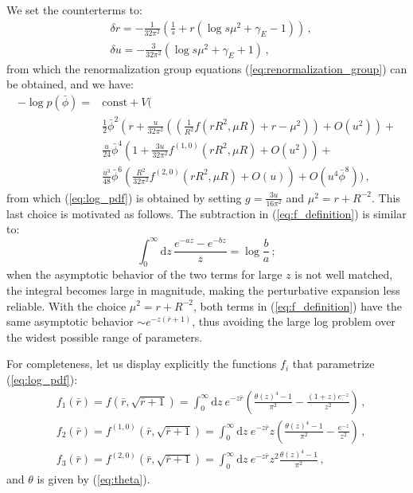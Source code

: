 \documentclass[11pt,a4paper]{article}
\newcommand{\dd}{\mathrm{d}}
\begin{document}
We set the counterterms to:
\begin{align}
    &\delta r = -\frac{1}{32\pi^2}\left(\frac{1}{s} + r\left(\log s \mu^2 + \gamma_E - 1\right)\right)\,,\\
    &\delta u = -\frac{3}{32\pi^2}\left(\log s\mu^2 +\gamma_E + 1\right)\,,
\end{align}
from which the renormalization group equations (\ref{eq:renormalization_group})
can be obtained, and we have:
\begin{equation}
\begin{split}
    -\log p(\bar{\phi}) =& \mathrm{const}+ V \Bigg( \\
    &\frac{1}{2} \bar{\phi}^2\left( r + \frac{u}{32\pi^2}  \left(\left(\frac{1}{R^2} f(rR^2, \mu R) + r - \mu^2\right)\right) + O(u^2)\right) + \\
    &\frac{u}{24} \bar{\phi}^4 \left(1 + \frac{3u}{32\pi^2} f^{(1, 0)}(rR^2, \mu R) + O(u^2)\right) + \\
    &\frac{u^3}{48}\bar{\phi}^6\left(\frac{R^2}{32\pi^2}f^{(2, 0)}(rR^2, \mu R) + O(u)\right) + O(u^4 \bar{\phi}^8) \Bigg)\,,
\end{split}
\end{equation}
from which (\ref{eq:log_pdf}) is obtained by setting $g = \frac{3 u}{16
\pi^2}$ and $\mu^2 = r + R^{-2}$. This last choice is motivated as follows. The
subtraction in (\ref{eq:f_definition}) is similar to:
\begin{equation}
    \int_0^{\infty} \dd z\, \frac{e^{-a z} - e^{-b z}}{z} = \log \frac{b}{a}\,;
\end{equation}
when the asymptotic behavior of the two terms for large $z$ is not well
matched, the integral becomes large in magnitude, making the perturbative
expansion less reliable. With the choice $\mu^2 = r + R^{-2}$, both terms in
(\ref{eq:f_definition}) have the same asymptotic behavior $\sim e^{-z(\bar{r} +
1)}$, thus avoiding the large log problem over the widest possible range of
parameters.

For completeness, let us display explicitly the functions $f_i$ that
parametrize (\ref{eq:log_pdf}):
\begin{align}
\label{eq:f_functions}
    &f_1(\bar r) = f(\bar r, \sqrt{\bar r + 1}) = 
    \int_{0}^{\infty} \dd z\ e^{-z \bar{r}} \left(\frac{\theta(z)^4 - 1}{\pi^2} - 
    \frac{(1 + z) e^{-z}}{z^2}\right)\,,\\
    &f_2(\bar r) = f^{(1, 0)}(\bar r, \sqrt{\bar r + 1}) = 
    \int_{0}^{\infty} \dd z\ e^{-z \bar{r}} z \left(\frac{\theta(z)^4 - 1}{\pi^2} - 
    \frac{e^{-z}}{z^2}\right)\,,\\
    &f_3(\bar r) = f^{(2, 0)}(\bar r, \sqrt{\bar r + 1}) = 
    \int_{0}^{\infty} \dd z\ e^{-z \bar{r}} z^2 \frac{\theta(z)^4 - 1}{\pi^2}\,,
\end{align}
and $\theta$ is given by (\ref{eq:theta}).
\end{document}
